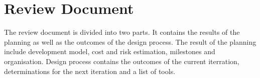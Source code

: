 \section*{Review Document}
The review document is divided into two parts.
It contains the results of the planning as well as the outcomes of the design process.
The result of the planning include development model, cost and risk estimation, milestones and organisation.
Design process contains the outcomes of the current iterration, determinations for the next iteration and a list of tools.


